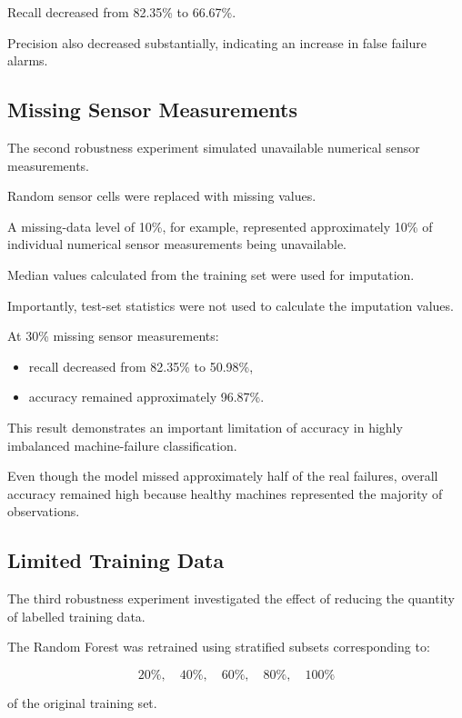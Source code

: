 \documentclass[conference]{IEEEtran}
\begin{document}
Recall decreased from 82.35\% to 66.67\%.

Precision also decreased substantially, indicating an increase in false failure alarms.

\subsection{Missing Sensor Measurements}

The second robustness experiment simulated unavailable numerical sensor measurements.

Random sensor cells were replaced with missing values.

A missing-data level of 10\%, for example, represented approximately 10\% of individual numerical sensor measurements being unavailable.

Median values calculated from the training set were used for imputation.

Importantly, test-set statistics were not used to calculate the imputation values.

At 30\% missing sensor measurements:

\begin{itemize}

    \item recall decreased from 82.35\% to 50.98\%,
    \item accuracy remained approximately 96.87\%.

\end{itemize}

This result demonstrates an important limitation of accuracy in highly imbalanced machine-failure classification.

Even though the model missed approximately half of the real failures, overall accuracy remained high because healthy machines represented the majority of observations.

\subsection{Limited Training Data}

The third robustness experiment investigated the effect of reducing the quantity of labelled training data.

The Random Forest was retrained using stratified subsets corresponding to:

\[
20\%,\quad
40\%,\quad
60\%,\quad
80\%,\quad
100\%
\]

of the original training set.
\end{document}
